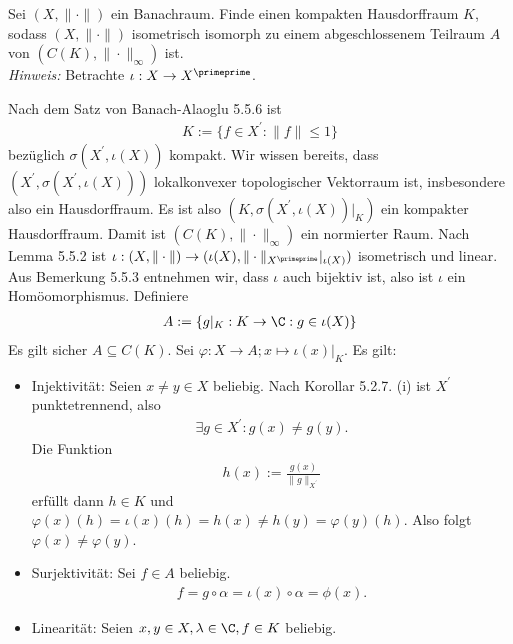 \begin{exercise}
Sei $(X,\|\cdot\|)$ ein Banachraum. Finde einen kompakten Hausdorffraum $K$, sodass
$(X,\|\cdot\|)$ isometrisch isomorph zu einem abgeschlossenem Teilraum $A$ von
$(C(K),\|\cdot\|_{\infty})$ ist. \\
\textit{Hinweis:} Betrachte $\iota: X \to X^{\primeprime}$.
\end{exercise}
\begin{solution}
Nach dem Satz von Banach-Alaoglu 5.5.6 ist 
\begin{align*}
  K := \{f \in X^{\prime}: \|f\| \leq 1\}
\end{align*}
bezüglich $\sigma(X^{\prime}, \iota(X))$ kompakt.
Wir wissen bereits, dass $(X^{\prime}, \sigma(X^{\prime},\iota(X)))$ lokalkonvexer
topologischer Vektorraum ist, insbesondere also ein Hausdorffraum.
Es ist also $(K, \sigma(X^{\prime},\iota(X))|_K)$ ein kompakter Hausdorffraum.
Damit ist $(C(K), \|\cdot\|_{\infty})$ ein normierter Raum.
Nach Lemma 5.5.2 ist $\iota: (X,\|\cdot\|) \to (\iota(X),\|\cdot\|_{X^{\primeprime}}|_{\iota(X)})$
isometrisch und linear.
Aus Bemerkung 5.5.3 entnehmen wir, dass $\iota$ auch bijektiv ist, also ist $\iota$
ein Homöomorphismus.
Definiere
\begin{align*}
  A := \{g|_K: K \to \C: g \in \iota(X)\}
\end{align*}
Es gilt sicher $A \subseteq C(K)$.
Sei $\varphi: X \to A; x \mapsto \iota(x)|_K$.
Es gilt:
\begin{itemize}
  \item Injektivität: Seien $x \neq y \in X$ beliebig. Nach Korollar 5.2.7. (i)
  ist $X^{\prime}$ punktetrennend, also
  \begin{align*}
    \exists g \in X^{\prime}: g(x) \neq g(y).
  \end{align*}
  Die Funktion
  \begin{align*}
    h(x) := \frac{g(x)}{\|g\|_{X^{\prime}}}
  \end{align*}
  erfüllt dann $h \in K$ und $\varphi(x)(h) = \iota(x)(h) = h(x) \neq h(y) = \varphi(y)(h)$.
  Also folgt $\varphi(x) \neq \varphi(y)$.
  \item Surjektivität: Sei $f \in A$ beliebig. \\
  \begin{align*}
    f = g \circ \alpha = \iota(x) \circ \alpha = \phi(x).
  \end{align*}
  \item Linearität: Seien $x,y \in X, \lambda \in \C, f \in K$ beliebig.

\end{itemize}
\end{solution}
